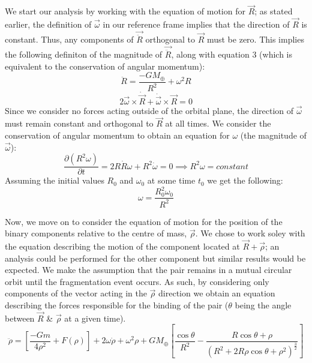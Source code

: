 \documentclass[letterpaper, preprint, paper,11pt]{AAS}	%
\begin{document}
We start our analysis by working with the equation of motion for $\vec{R}$; as stated earlier, the definition of $\vec{\omega}$ in our reference frame implies that the direction of $\vec{R}$ is constant. Thus, any components of $\vec{\ddot{R}}$ orthogonal to $\vec{R}$ must be zero. This implies the following definiton of the magnitude of $\vec{\ddot{R}}$, along with equation 3 (which is equivalent to the conservation of angular momentum): 
\begin{equation}
\ddot{R} = \frac{-GM_\oplus}{R^{2}}+\omega^{2}R
\end{equation}
\begin{equation}
2\vec{\omega}\times\dot{\vec{R}}+\dot{\vec{\omega}}\times\vec{R}=0
\end{equation}
Since we consider no forces acting outside of the orbital plane, the direction of $\vec{\omega}$ must remain constant and orthogonal to $\vec{R}$ at all times. We consider the conservation of angular momentum to obtain an equation for $\omega$ (the magnitude of $\vec{\omega}$):
\begin{equation}
\frac{\partial\left(R^{2}\omega\right)}{\partial t} = 2R\dot{R}\omega + R^{2}\dot{\omega} = 0 \implies R^{2}\omega = constant
\end{equation}
Assuming the initial values $R_0$ and $\omega_0$ at some time $t_0$ we get the following:
\begin{equation}
\omega = \frac{R_0^{2}\omega_0}{R^{2}}
\end{equation}

Now, we move on to consider the equation of motion for the position of the binary components relative to the centre of mass, $\vec{\rho}$. We chose to work soley with the equation describing the motion of the component located at $\vec{R}+\vec{\rho}$; an analysis could be performed for the other component but similar results would be expected. We make the assumption that the pair remains in a mutual circular orbit until the fragmentation event occurs. As such, by considering only components of the vector acting in the $\vec{\rho}$ direction we obtain an equation describing the forces responsible for the binding of the pair ($\theta$ being the angle between $\vec{R}$ \& $\vec{\rho}$ at a given time).
\begin{equation}\label{eq:rdd}
\ddot{\rho} = \left[\frac{-Gm}{4\rho^{2}}+F(\rho)\right]+2\omega\dot{\rho}+\omega^{2}\rho+{GM_\oplus}\left[\frac{\cos\theta}{R^{2}}-\frac{R\cos\theta+\rho}{(R^{2}+2R\rho\cos\theta+\rho^{2})^\frac{3}{2}}\right]
\end{equation}
\end{document}
